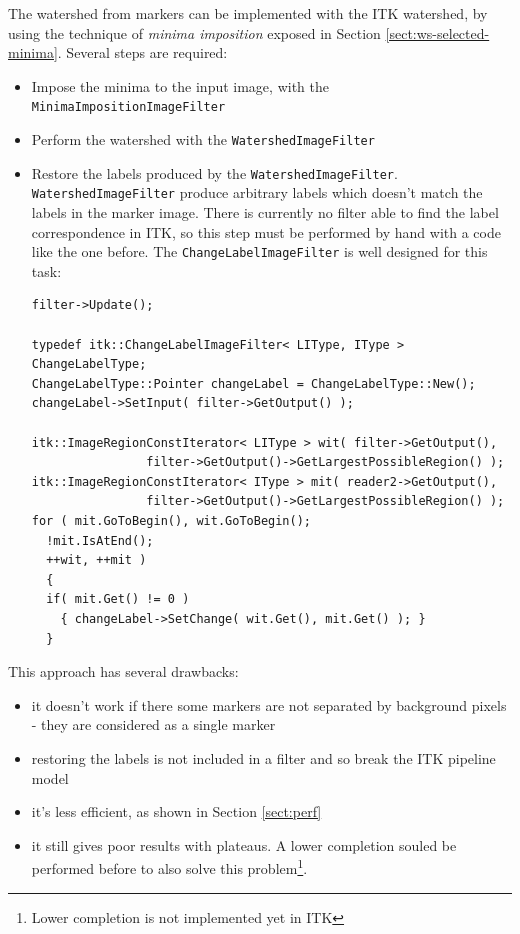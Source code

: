 \documentclass{InsightArticle}
\begin{document}
The watershed from markers can be implemented with the ITK watershed,
by using the technique of {\em minima imposition} exposed in Section
\ref{sect:ws-selected-minima}. Several steps are required:
\begin{itemize}
  \item Impose the minima to the input image, with the
\verb$MinimaImpositionImageFilter$
  \item Perform the watershed with the \verb$WatershedImageFilter$
  \item Restore the labels produced by the \verb$WatershedImageFilter$.
\verb$WatershedImageFilter$ produce arbitrary labels which doesn't match
the labels in the marker image. There is currently no filter able to
find the label correspondence in ITK, so this step must be performed by
hand with a code like the one before. The \verb$ChangeLabelImageFilter$
is well designed for this task:
\small \begin{verbatim}
filter->Update();

typedef itk::ChangeLabelImageFilter< LIType, IType > ChangeLabelType;
ChangeLabelType::Pointer changeLabel = ChangeLabelType::New();
changeLabel->SetInput( filter->GetOutput() );

itk::ImageRegionConstIterator< LIType > wit( filter->GetOutput(),
                filter->GetOutput()->GetLargestPossibleRegion() );
itk::ImageRegionConstIterator< IType > mit( reader2->GetOutput(),
                filter->GetOutput()->GetLargestPossibleRegion() );
for ( mit.GoToBegin(), wit.GoToBegin();
  !mit.IsAtEnd();
  ++wit, ++mit )
  {
  if( mit.Get() != 0 )
    { changeLabel->SetChange( wit.Get(), mit.Get() ); }
  }
\end{verbatim} \normalsize
\end{itemize}

This approach has several drawbacks:
\begin{itemize}
  \item it doesn't work if there some markers are not separated by background
pixels - they are considered as a single marker
  \item restoring the labels is not included in a filter and so break the
ITK pipeline model
  \item it's less efficient, as shown in Section \ref{sect:perf}
  \item it still gives poor results with plateaus. A lower completion
souled be performed before to also solve this problem\footnote{Lower
completion is not implemented yet in ITK}.
\end{itemize}
\end{document}

